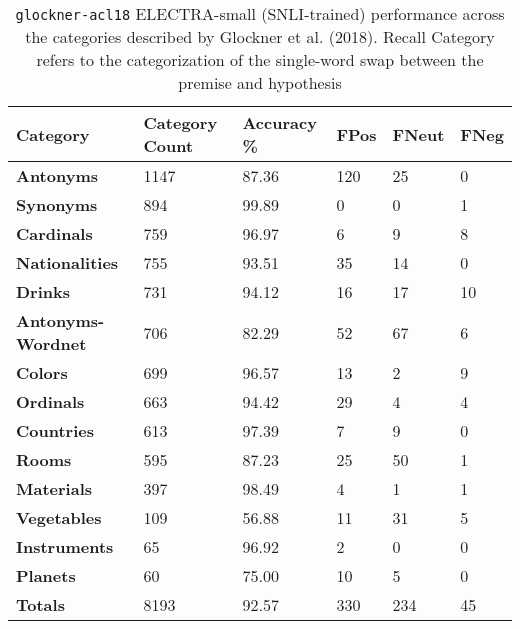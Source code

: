 \documentclass[11pt,a4paper]{article}
\begin{document}
\begin{table}[hbt!]
\begin{center}
\begin{tabular}
{p{}|p{} p{} p{} p{} p{} }
  {\tiny \textbf{Category}} & {\tiny \textbf{Category} \textbf{Count}} & {\tiny \textbf{Accuracy} {\%}} & {\tiny \textbf{FPos}} & {\tiny \textbf{FNeut}} & {\tiny \textbf{FNeg}} \\
  \hline
  {\tiny \textbf{Antonyms}} & {\tiny 1147} & {\tiny 87.36} & {\tiny 120} & {\tiny 25} & {\tiny 0} \\
  {\tiny \textbf{Synonyms}} & {\tiny 894} & {\tiny 99.89} & {\tiny 0} & {\tiny 0} & {\tiny 1} \\
  {\tiny \textbf{Cardinals}} & {\tiny 759} & {\tiny 96.97} & {\tiny 6} & {\tiny 9} & {\tiny 8} \\
  {\tiny \textbf{Nationalities}} & {\tiny 755} & {\tiny 93.51} & {\tiny 35} & {\tiny 14} & {\tiny 0} \\
  {\tiny \textbf{Drinks}} & {\tiny 731} & {\tiny 94.12} & {\tiny 16} & {\tiny 17} & {\tiny 10} \\
  {\tiny \textbf{Antonyms-Wordnet}} & {\tiny 706} & {\tiny 82.29} & {\tiny 52} & {\tiny 67} & {\tiny 6} \\
  {\tiny \textbf{Colors}} & {\tiny 699} & {\tiny 96.57} & {\tiny 13} & {\tiny 2} & {\tiny 9} \\
  {\tiny \textbf{Ordinals}} & {\tiny 663} & {\tiny 94.42} & {\tiny 29} & {\tiny 4} & {\tiny 4} \\
  {\tiny \textbf{Countries}} & {\tiny 613} & {\tiny 97.39} & {\tiny 7} & {\tiny 9} & {\tiny 0} \\
  {\tiny \textbf{Rooms}} & {\tiny 595} & {\tiny 87.23} & {\tiny 25} & {\tiny 50} & {\tiny 1} \\
  {\tiny \textbf{Materials}} & {\tiny 397} & {\tiny 98.49} & {\tiny 4} & {\tiny 1} & {\tiny 1} \\
  {\tiny \textbf{Vegetables}} & {\tiny 109} & {\tiny 56.88} & {\tiny 11} & {\tiny 31} & {\tiny 5} \\
  {\tiny \textbf{Instruments}} & {\tiny 65} & {\tiny 96.92} & {\tiny 2} & {\tiny 0} & {\tiny 0} \\
  {\tiny \textbf{Planets}} & {\tiny 60} & {\tiny 75.00} & {\tiny 10} & {\tiny 5} & {\tiny 0} \\
  {\tiny \textbf{Totals}} & {\tiny 8193} & {\tiny 92.57} & {\tiny 330} & {\tiny 234} & {\tiny 45} \\
\end{tabular}
\end{center}
\caption{\texttt{glockner-acl18} ELECTRA-small (SNLI-trained) performance across the categories described by Glockner et al. (2018). Recall  Category refers to the categorization of the single-word swap between the premise and hypothesis}
\end{table}
\end{document}
